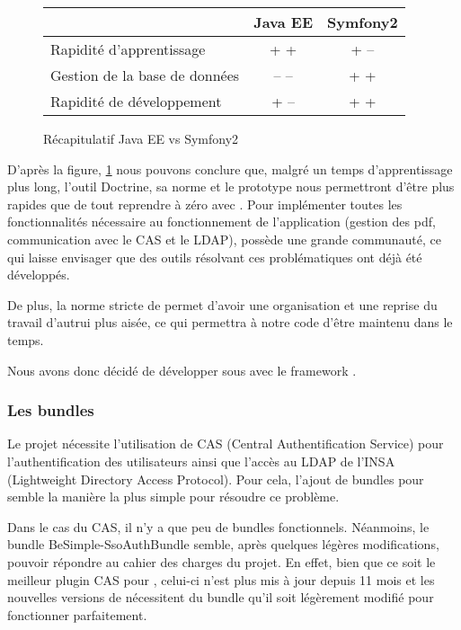 \begin{figure}[H]
\begin{center}
\begin{tabular}{|l|c|c|}
	\hline
	\null & \textbf{Java EE} & \textbf{Symfony2} \\
	\hline
	Rapidité d'apprentissage & + + & + --\\
	\hline
	Gestion de la base de données & -- -- & + +\\
	\hline
	Rapidité de développement & + -- & + + \\
	\hline
\end{tabular} \vspace*{5mm}
\caption{\label{FrameworkTable} Récapitulatif Java EE vs Symfony2}
\end{center}
\end{figure}
D'après la figure, \ref{FrameworkTable} nous pouvons conclure que, malgré un temps d'apprentissage plus long,  l'outil Doctrine, sa norme et le prototype nous permettront d'être plus rapides que de tout reprendre à zéro avec \jee.
\smallbreak
Pour implémenter toutes les fonctionnalités nécessaire au fonctionnement de l'application (gestion des pdf, communication avec le CAS et le LDAP), \symfony possède une grande communauté, ce qui laisse envisager que des outils résolvant ces problématiques ont déjà été développés.

De plus, la norme stricte de \symfony permet d'avoir une organisation et une reprise du travail d'autrui plus aisée, ce qui permettra à notre code d'être maintenu dans le temps.
\medbreak

Nous avons donc décidé de développer sous \php avec le framework \symfony.

\subsubsection{Les bundles \symfony}

Le projet nécessite l'utilisation de CAS (Central Authentification Service) pour l'authentification des utilisateurs ainsi que l'accès au LDAP de l'INSA (Lightweight Directory Access Protocol). Pour cela, l'ajout de bundles pour \symfony semble la manière la plus simple pour résoudre ce problème.

Dans le cas du CAS, il n'y a que peu de bundles fonctionnels. Néanmoins, le bundle \og BeSimple-SsoAuthBundle \fg semble, après quelques légères modifications, pouvoir répondre au cahier des charges du projet. En effet, bien que ce soit le meilleur plugin CAS pour \symfony, celui-ci n'est plus mis à jour depuis 11 mois et les nouvelles versions de \symfony nécessitent du bundle qu'il soit légèrement modifié pour fonctionner parfaitement.

